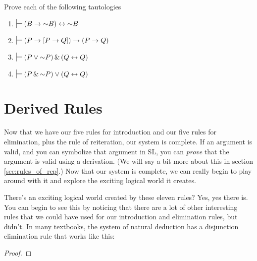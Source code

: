 {\noindent\problempart
Prove each of the following tautologies
\begin{enumerate}[label=(\arabic*)]
\item $\sststile{}{} (B \eif \enot B) \eiff \enot B$


\item $\sststile{}{} (P \eif [P \eif Q]) \eif (P \eif Q)$ %

\item $\sststile{}{} (P \eor \enot P) \eand (Q \eiff Q) $ %

\item $\sststile{}{} (P \eand \enot P) \eor  (Q \eiff Q)$%

\end{enumerate}


\section{Derived Rules}
\setlength{\parindent}{1em}


Now that we have our five rules for introduction and our five rules for elimination, plus the rule of reiteration, our system is complete. If an argument is valid, and you can symbolize that argument in SL, you can \emph{prove} that the argument is valid using a derivation. (We will say a bit more about this in section \ref{sec:rules_of_rep}.) Now that our system is complete, we can really begin to play around with it and explore the exciting  logical world it creates.

There's an exciting logical world created by these eleven rules? Yes, yes there is. You can begin to see this by noticing that there are a lot of other interesting rules that we could have used for our introduction and elimination rules, but didn't. In many textbooks, the system of natural deduction has a disjunction elimination rule that works like this:

\begin{proof}
	 
\end{proof}

}
